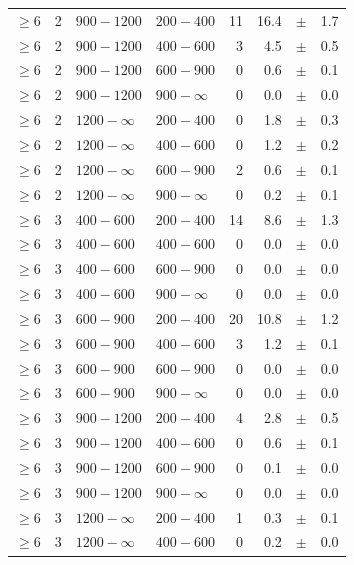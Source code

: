 \begin{table}[!t]
\begin{tabular}{rrllrrcl}
$\geq 6$ & 2 & $ 900-1200$ & $200-400$ &     11 &     16.4 &$\pm$&    1.7 \\
$\geq 6$ & 2 & $ 900-1200$ & $400-600$ &      3 &      4.5 &$\pm$&    0.5 \\
$\geq 6$ & 2 & $ 900-1200$ & $600-900$ &      0 &      0.6 &$\pm$&    0.1 \\
$\geq 6$ & 2 & $ 900-1200$ & $900-\infty$ &      0 &      0.0 &$\pm$&    0.0 \\
$\geq 6$ & 2 & $1200- \infty$ & $200-400$ &      0 &      1.8 &$\pm$&    0.3 \\
$\geq 6$ & 2 & $1200- \infty$ & $400-600$ &      0 &      1.2 &$\pm$&    0.2 \\
$\geq 6$ & 2 & $1200- \infty$ & $600-900$ &      2 &      0.6 &$\pm$&    0.1 \\
$\geq 6$ & 2 & $1200- \infty$ & $900-\infty$ &      0 &      0.2 &$\pm$&    0.1 \\
$\geq 6$ & 3 & $ 400- 600$ & $200-400$ &     14 &      8.6 &$\pm$&    1.3 \\
$\geq 6$ & 3 & $ 400- 600$ & $400-600$ &      0 &      0.0 &$\pm$&    0.0 \\
$\geq 6$ & 3 & $ 400- 600$ & $600-900$ &      0 &      0.0 &$\pm$&    0.0 \\
$\geq 6$ & 3 & $ 400- 600$ & $900-\infty$ &      0 &      0.0 &$\pm$&    0.0 \\
$\geq 6$ & 3 & $ 600- 900$ & $200-400$ &     20 &     10.8 &$\pm$&    1.2 \\
$\geq 6$ & 3 & $ 600- 900$ & $400-600$ &      3 &      1.2 &$\pm$&    0.1 \\
$\geq 6$ & 3 & $ 600- 900$ & $600-900$ &      0 &      0.0 &$\pm$&    0.0 \\
$\geq 6$ & 3 & $ 600- 900$ & $900-\infty$ &      0 &      0.0 &$\pm$&    0.0 \\
$\geq 6$ & 3 & $ 900-1200$ & $200-400$ &      4 &      2.8 &$\pm$&    0.5 \\
$\geq 6$ & 3 & $ 900-1200$ & $400-600$ &      0 &      0.6 &$\pm$&    0.1 \\
$\geq 6$ & 3 & $ 900-1200$ & $600-900$ &      0 &      0.1 &$\pm$&    0.0 \\
$\geq 6$ & 3 & $ 900-1200$ & $900-\infty$ &      0 &      0.0 &$\pm$&    0.0 \\
$\geq 6$ & 3 & $1200- \infty$ & $200-400$ &      1 &      0.3 &$\pm$&    0.1 \\
$\geq 6$ & 3 & $1200- \infty$ & $400-600$ &      0 &      0.2 &$\pm$&    0.0 \\

\end{tabular}
\end{table}
